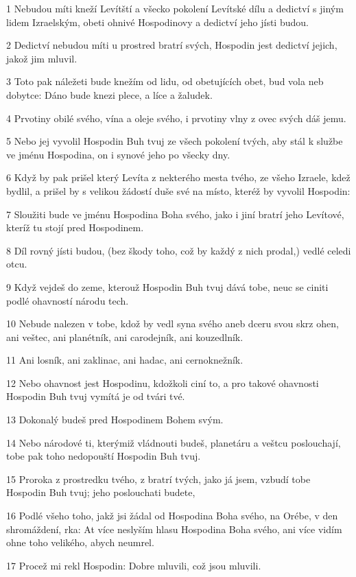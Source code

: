 \par 1 Nebudou míti kneží Levítští a všecko pokolení Levítské dílu a dedictví s jiným lidem Izraelským, obeti ohnivé Hospodinovy a dedictví jeho jísti budou.
\par 2 Dedictví nebudou míti u prostred bratrí svých, Hospodin jest dedictví jejich, jakož jim mluvil.
\par 3 Toto pak náležeti bude knežím od lidu, od obetujících obet, bud vola neb dobytce: Dáno bude knezi plece, a líce a žaludek.
\par 4 Prvotiny obilé svého, vína a oleje svého, i prvotiny vlny z ovec svých dáš jemu.
\par 5 Nebo jej vyvolil Hospodin Buh tvuj ze všech pokolení tvých, aby stál k službe ve jménu Hospodina, on i synové jeho po všecky dny.
\par 6 Když by pak prišel který Levíta z nekterého mesta tvého, ze všeho Izraele, kdež bydlil, a prišel by s velikou žádostí duše své na místo, kteréž by vyvolil Hospodin:
\par 7 Sloužiti bude ve jménu Hospodina Boha svého, jako i jiní bratrí jeho Levítové, kteríž tu stojí pred Hospodinem.
\par 8 Díl rovný jísti budou, (bez škody toho, což by každý z nich prodal,) vedlé celedi otcu.
\par 9 Když vejdeš do zeme, kterouž Hospodin Buh tvuj dává tobe, neuc se ciniti podlé ohavností národu tech.
\par 10 Nebude nalezen v tobe, kdož by vedl syna svého aneb dceru svou skrz ohen, ani veštec, ani planétník, ani carodejník, ani kouzedlník.
\par 11 Ani losník, ani zaklinac, ani hadac, ani cernoknežník.
\par 12 Nebo ohavnost jest Hospodinu, kdožkoli ciní to, a pro takové ohavnosti Hospodin Buh tvuj vymítá je od tvári tvé.
\par 13 Dokonalý budeš pred Hospodinem Bohem svým.
\par 14 Nebo národové ti, kterýmiž vládnouti budeš, planetáru a veštcu poslouchají, tobe pak toho nedopouští Hospodin Buh tvuj.
\par 15 Proroka z prostredku tvého, z bratrí tvých, jako já jsem, vzbudí tobe Hospodin Buh tvuj; jeho poslouchati budete,
\par 16 Podlé všeho toho, jakž jsi žádal od Hospodina Boha svého, na Orébe, v den shromáždení, rka: At více neslyším hlasu Hospodina Boha svého, ani více vidím ohne toho velikého, abych neumrel.
\par 17 Procež mi rekl Hospodin: Dobre mluvili, což jsou mluvili.
